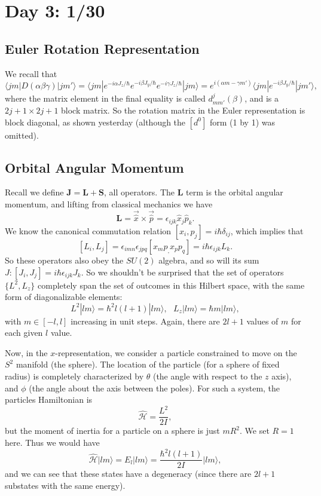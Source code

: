 \documentclass[fontsize=12pt]{scrartcl}
\newcommand{\bv}[1]{\mathrm{\textbf{#1}}}
\newcommand{\la}{\langle}
\newcommand{\ra}{\rangle}
\newcommand{\pos}{\hat{x}}
\newcommand{\posv}{\vec{\hat{x}}}
\newcommand{\mom}{\hat{p}}
\newcommand{\momv}{\vec{\hat{p}}}
\newcommand{\Ham}{\hat{\mathcal{H}}}
\begin{document}
\section{Day 3: 1/30}

\subsection{Euler Rotation Representation}

We recall that $$\la jm|D(\alpha\beta\gamma)|jm'\ra=\la jm|e^{-i\alpha J_z/\hbar}e^{-i\beta J_y/\hbar}e^{-i\gamma J_z/\hbar}|jm\ra=e^{i(\alpha m-\gamma m')}\la jm|e^{-i\beta J_y/\hbar}|jm'\ra,$$ where the matrix element in the final equality is called $d_{mm'}^j(\beta)$, and is a $2j+1\times 2j+1$ block matrix. So the rotation matrix in the Euler representation is block diagonal, as shown yesterday (although the $[d^0]$ form (1 by 1) was omitted).

\subsection{Orbital Angular Momentum}

Recall we define $\bv{J}=\bv{L}+\bv{S}$, all operators. The $\bv{L}$ term is the orbital angular momentum, and lifting from classical mechanics we have $$\bv{L}=\posv\times\momv=\epsilon_{ijk}\pos_j\mom_k.$$ We know the canonical commutation relation $[x_i,p_j]=i\hbar \delta_{ij}$, which implies that $$[L_i,L_j]=\epsilon_{imn}\epsilon_{jpq}[x_mp_,x_pp_q]=i\hbar \epsilon_{ijk} L_k.$$ So these operators also obey the $SU(2)$ algebra, and so will its sum $J: [J_i, J_j]=i\hbar \epsilon_{ijk} J_k$. So we shouldn't be surprised that the set of operators $\{L^2,L_z\}$ completely span the set of outcomes in this Hilbert space, with the same form of diagonalizable elements: $$L^2|lm\ra = \hbar^2l(l+1)|lm\ra, \ \ \ L_z|lm\ra = \hbar m|lm\ra,$$ with $m\in[-l,l]$ increasing in unit steps. Again, there are $2l+1$ values of $m$ for each given $l$ value.

Now, in the $x$-representation, we consider a particle constrained to move on the $S^2$ manifold (the sphere). The location of the particle (for a sphere of fixed radius) is completely characterized by $\theta$ (the angle with respect to the $z$ axis), and $\phi$ (the angle about the axis between the poles). For such a system, the particles Hamiltonian is $$\Ham=\frac{L^2}{2I},$$ but the moment of inertia for a particle on a sphere is just $mR^2$. We set $R=1$ here. Thus we would have $$\Ham|lm\ra = E_l|lm\ra = \frac{\hbar^2l(l+1)}{2I}|lm\ra,$$ and we can see that these states have a degeneracy (since there are $2l+1$ substates with the same energy).
\end{document}
